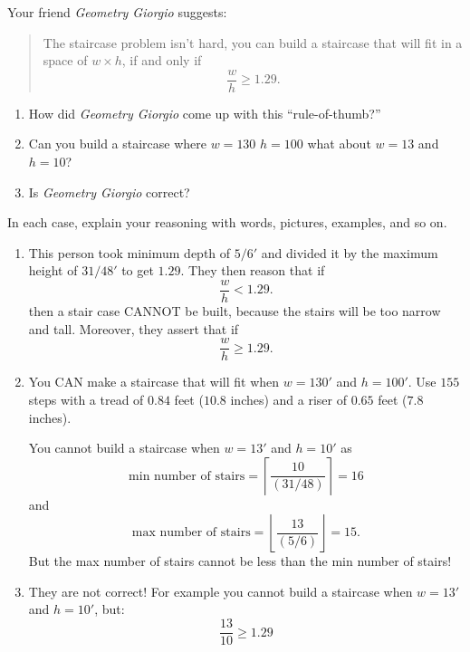 \documentclass[noauthor,nooutcomes,handout]{ximera}
\begin{document}
\begin{question}
  Your friend \textit{Geometry Giorgio} suggests:
  \begin{quote}
    The staircase problem isn't hard, you can build a staircase that
    will fit in a space of $w\times h$, if and only if
    \[
    \frac{w}{h} \ge 1.29.
    \]
  \end{quote}
  \begin{enumerate}
    \item How did \textit{Geometry Giorgio} come up with this ``rule-of-thumb?''
    \item Can you build a staircase where  $w=130$ $h=100$ what about $w=13$ and $h=10$?
    \item Is \textit{Geometry Giorgio} correct?
       
  \end{enumerate}
  In each case, explain your reasoning with words, pictures, examples, and so on.
  \begin{freeResponse}
    \begin{enumerate}
    \item This person took minimum depth of $5/6'$ and divided it by
      the maximum height of $31/48'$ to get $1.29$. They then reason that if
      \[
      \frac{w}{h} <1.29.
      \]
      then a stair case CANNOT be built, because the stairs will be
      too narrow and tall. Moreover, they assert that if
      \[
      \frac{w}{h} \ge 1.29.
      \]
    \item You CAN make a staircase that will fit when $w=130'$ and
      $h=100'$. Use $155$ steps with a tread of $0.84$ feet ($10.8$
      inches) and a riser of $0.65$ feet ($7.8$ inches).


      You cannot build a staircase when $w=13'$ and $h=10'$ as
      \[
      \text{min number of stairs} = \left\lceil
      \frac{10}{\left(31/48\right)} \right\rceil=16
      \]
      and
      \[
      \text{max number of stairs} = \left\lfloor
      \frac{13}{\left(5/6\right)} \right\rfloor=15.
      \]
      But the max number of stairs cannot be less than the min number
      of stairs!

    \item They are not correct! For example you cannot build a
      staircase when $w=13'$ and $h=10'$, but:
      \[
      \frac{13}{10}\ge 1.29
      \]
    \end{enumerate}
  \end{freeResponse}
\end{question}
\end{document}
